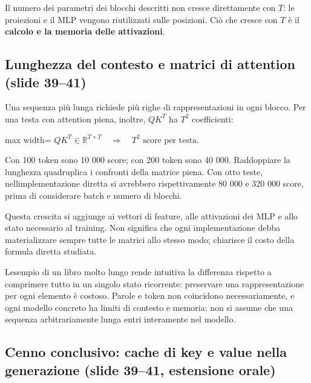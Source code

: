 \documentclass[11pt,a4paper,oneside,openany]{book}
\begin{document}
Il numero dei parametri dei blocchi descritti non cresce direttamente con \(T\): le proiezioni e il MLP vengono riutilizzati sulle posizioni. Ciò che cresce con \(T\) è il \textbf{calcolo e la memoria delle attivazioni}.

\subsection{Lunghezza del contesto e matrici di attention (slide 39--41)}\label{f04-r878}

Una sequenza più lunga richiede più righe di rappresentazioni in ogni blocco. Per una testa con attention piena, inoltre, \(QK^T\) ha \(T^2\) coefficienti:

\begin{center}
\begin{adjustbox}{max width=\linewidth}
$\displaystyle \boxed{QK^T\in\mathbb R^{T\times T}\quad\Longrightarrow\quad T^2\text{ score per testa}.}$
\end{adjustbox}
\end{center}

Con 100 token sono 10 000 score; con 200 token sono 40 000. Raddoppiare la lunghezza quadruplica i confronti della matrice piena. Con otto teste, nell\textquotesingle implementazione diretta si avrebbero rispettivamente 80 000 e 320 000 score, prima di considerare batch e numero di blocchi.

Questa crescita si aggiunge ai vettori di feature, alle attivazioni dei MLP e allo stato necessario al training. Non significa che ogni implementazione debba materializzare sempre tutte le matrici allo stesso modo; chiarisce il costo della formula diretta studiata.

L\textquotesingle esempio di un libro molto lungo rende intuitiva la differenza rispetto a comprimere tutto in un singolo stato ricorrente: preservare una rappresentazione per ogni elemento è costoso. Parole e token non coincidono necessariamente, e ogni modello concreto ha limiti di contesto e memoria: non si assume che una sequenza arbitrariamente lunga entri interamente nel modello.

\subsection{Cenno conclusivo: cache di key e value nella generazione (slide 39--41, estensione orale)}\label{f04-r890}
\end{document}

